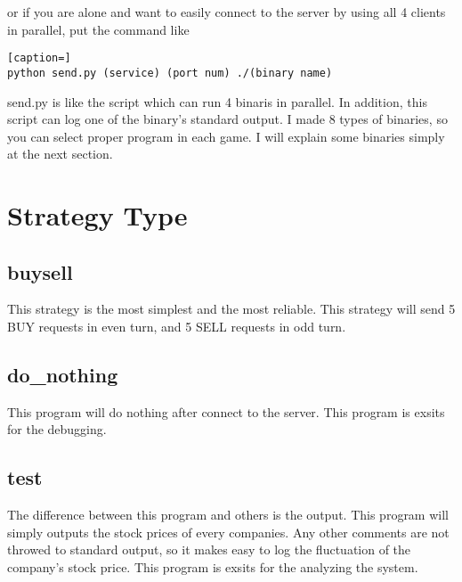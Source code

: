 \documentclass{article}
\begin{document}
        \noindent or if you are alone and want to easily connect to the server by using all 4 clients in parallel,
        put the command like

        \begin{lstlisting}[caption=]
python send.py (service) (port num) ./(binary name)
        \end{lstlisting}

        send.py is like the script which can run 4 binaris in parallel.
        In addition, this script can log one of the binary's standard output.
        I made 8 types of binaries, so you can select proper program in each game.
        I will explain some binaries simply at the next section.


    \section{Strategy Type} %
    \label{sec:strategy_type}

        \subsection{buysell} %
        \label{sub:buysell}

            This strategy is the most simplest and the most reliable.
            This strategy will send 5 BUY requests in even turn,
            and 5 SELL requests in odd turn.


        \subsection{do\_nothing} %
        \label{sub:do_nothing}

            This program will do nothing after connect to the server.
            This program is exsits for the debugging.


        \subsection{test} %
        \label{sub:test}

            The difference between this program and others is the output.
            This program will simply outputs the stock prices of every companies.
            Any other comments are not throwed to standard output, so it makes easy to log the fluctuation of the company's stock price.
            This program is exsits for the analyzing the system.
\end{document}
